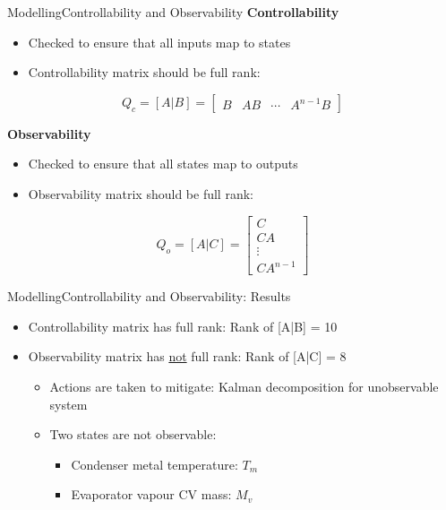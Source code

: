 
\begin{frame}{Modelling}{Controllability and Observability}
	\textbf{Controllability}
	\begin{itemize}
		\item Checked to ensure that all inputs map to states
		\item Controllability matrix should be full rank:
	\end{itemize}
	\begin{equation} \label{eq:ctrb}
		Q_c = [A|B] = \begin{bmatrix}  B & AB & \cdots & A^{n-1}B  \end{bmatrix}
	\end{equation}

	\textbf{Observability}
	\begin{itemize}
		\item Checked to ensure that all states map to outputs
		\item Observability matrix should be full rank:
	\end{itemize}
	\begin{equation}
		Q_o = [A|C] = \begin{bmatrix}
			C \\ CA \\ \vdots \\ CA^{n-1}
		\end{bmatrix}
	\end{equation}
\end{frame}




\begin{frame}{Modelling}{Controllability and Observability: Results}
	\begin{itemize}
		\item Controllability matrix has full rank: Rank of [A|B] = 10
		\item Observability matrix has \underline{not} full rank: Rank of [A|C] = 8
			\begin{itemize}
				\item Actions are taken to mitigate: Kalman decomposition for unobservable system
				\item Two states are not observable: 
				\begin{itemize}
					\item Condenser metal temperature: $T_m$
					\item Evaporator vapour CV mass: $M_v$
				\end{itemize} 
			\end{itemize}
		
	\end{itemize}
\end{frame}



